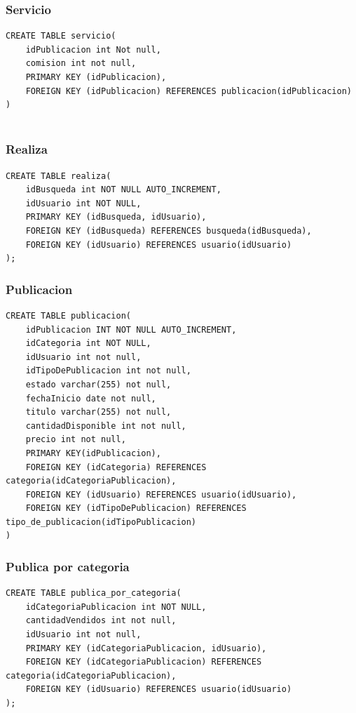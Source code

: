 \documentclass[a4paper, 10pt, twoside]{article}
\begin{document}
\subsubsection{Servicio}
\begin{verbatim}
CREATE TABLE servicio(
	idPublicacion int Not null,
    comision int not null,
    PRIMARY KEY (idPublicacion),
    FOREIGN KEY (idPublicacion) REFERENCES publicacion(idPublicacion)
)


\end{verbatim}
\subsubsection{Realiza}
\begin{verbatim}
CREATE TABLE realiza(
	idBusqueda int NOT NULL AUTO_INCREMENT,
	idUsuario int NOT NULL, 
	PRIMARY KEY	(idBusqueda, idUsuario),
    FOREIGN KEY (idBusqueda) REFERENCES busqueda(idBusqueda),
    FOREIGN KEY (idUsuario) REFERENCES usuario(idUsuario)
);
\end{verbatim}
\subsubsection{Publicacion}
\begin{verbatim}
CREATE TABLE publicacion(
	idPublicacion INT NOT NULL AUTO_INCREMENT,
	idCategoria int NOT NULL,
    idUsuario int not null,
    idTipoDePublicacion int not null,
    estado varchar(255) not null,
    fechaInicio date not null,
    titulo varchar(255) not null,
    cantidadDisponible int not null,
    precio int not null,
    PRIMARY KEY(idPublicacion),
    FOREIGN KEY (idCategoria) REFERENCES categoria(idCategoriaPublicacion),
    FOREIGN KEY (idUsuario) REFERENCES usuario(idUsuario),
    FOREIGN KEY (idTipoDePublicacion) REFERENCES tipo_de_publicacion(idTipoPublicacion)
)
\end{verbatim}
\subsubsection{Publica por categoria}
\begin{verbatim}
CREATE TABLE publica_por_categoria(
	idCategoriaPublicacion int NOT NULL,
	cantidadVendidos int not null,
	idUsuario int not null,
    PRIMARY KEY (idCategoriaPublicacion, idUsuario),
    FOREIGN KEY (idCategoriaPublicacion) REFERENCES categoria(idCategoriaPublicacion),
    FOREIGN KEY (idUsuario) REFERENCES usuario(idUsuario)
);

\end{verbatim}
\end{document}
